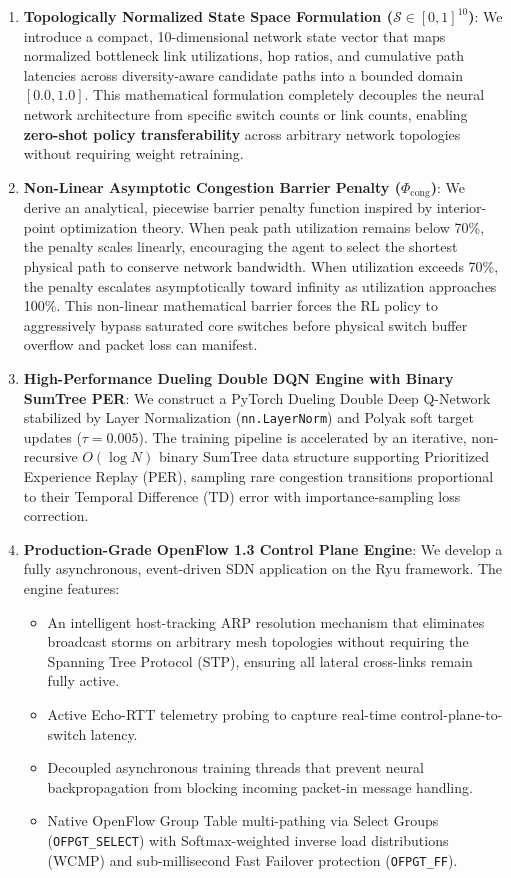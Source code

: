 \begin{enumerate}[label=\textbf{\arabic*.}]
    \item \textbf{Topologically Normalized State Space Formulation ($\mathcal{S} \in [0, 1]^{10}$)}:
    We introduce a compact, 10-dimensional network state vector that maps normalized bottleneck link utilizations, hop ratios, and cumulative path latencies across diversity-aware candidate paths into a bounded domain $[0.0, 1.0]$. This mathematical formulation completely decouples the neural network architecture from specific switch counts or link counts, enabling \textbf{zero-shot policy transferability} across arbitrary network topologies without requiring weight retraining.
    
    \item \textbf{Non-Linear Asymptotic Congestion Barrier Penalty ($\Phi_{\text{cong}}$)}:
    We derive an analytical, piecewise barrier penalty function inspired by interior-point optimization theory. When peak path utilization remains below 70\%, the penalty scales linearly, encouraging the agent to select the shortest physical path to conserve network bandwidth. When utilization exceeds 70\%, the penalty escalates asymptotically toward infinity as utilization approaches 100\%. This non-linear mathematical barrier forces the RL policy to aggressively bypass saturated core switches before physical switch buffer overflow and packet loss can manifest.
    
    \item \textbf{High-Performance Dueling Double DQN Engine with Binary SumTree PER}:
    We construct a PyTorch Dueling Double Deep Q-Network stabilized by Layer Normalization (\texttt{nn.LayerNorm}) and Polyak soft target updates ($\tau = 0.005$). The training pipeline is accelerated by an iterative, non-recursive $O(\log N)$ binary SumTree data structure supporting Prioritized Experience Replay (PER), sampling rare congestion transitions proportional to their Temporal Difference (TD) error with importance-sampling loss correction.
    
    \item \textbf{Production-Grade OpenFlow 1.3 Control Plane Engine}:
    We develop a fully asynchronous, event-driven SDN application on the Ryu framework. The engine features:
    \begin{itemize}
        \item An intelligent host-tracking ARP resolution mechanism that eliminates broadcast storms on arbitrary mesh topologies without requiring the Spanning Tree Protocol (STP), ensuring all lateral cross-links remain fully active.
        \item Active Echo-RTT telemetry probing to capture real-time control-plane-to-switch latency.
        \item Decoupled asynchronous training threads that prevent neural backpropagation from blocking incoming packet-in message handling.
        \item Native OpenFlow Group Table multi-pathing via Select Groups (\texttt{OFPGT\_SELECT}) with Softmax-weighted inverse load distributions (WCMP) and sub-millisecond Fast Failover protection (\texttt{OFPGT\_FF}).
    \end{itemize}
    

\end{enumerate}
